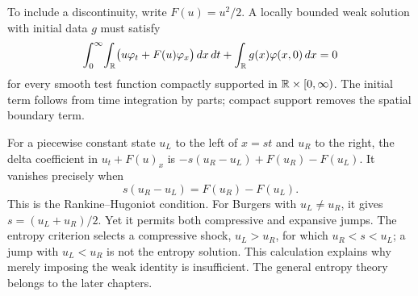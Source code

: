 To include a discontinuity, write $F(u)=u^2/2$. A locally bounded weak
solution with initial data $g$ must satisfy
\[
 \int_0^\infty\!\int_{\mathbb{R}}
   \bigl(u\varphi_t+F(u)\varphi_x\bigr)\,dx\,dt
 +\int_{\mathbb{R}}g(x)\varphi(x,0)\,dx=0
\]
for every smooth test function compactly supported in
$\mathbb{R}\times[0,\infty)$. The initial term follows from time integration by
parts; compact support removes the spatial boundary term.

For a piecewise constant state $u_L$ to the left of $x=st$ and $u_R$ to
the right, the delta coefficient in $u_t+F(u)_x$ is
$-s(u_R-u_L)+F(u_R)-F(u_L)$. It vanishes precisely when
\[
 s(u_R-u_L)=F(u_R)-F(u_L).
\]
This is the Rankine--Hugoniot condition. For Burgers with $u_L\ne u_R$,
it gives $s=(u_L+u_R)/2$. Yet it permits both compressive and expansive
jumps. The entropy criterion selects a compressive shock, $u_L>u_R$,
for which $u_R<s<u_L$; a jump with $u_L<u_R$ is not the entropy solution.
This calculation explains why merely imposing the weak identity is
insufficient. The general entropy theory belongs to the later chapters.
